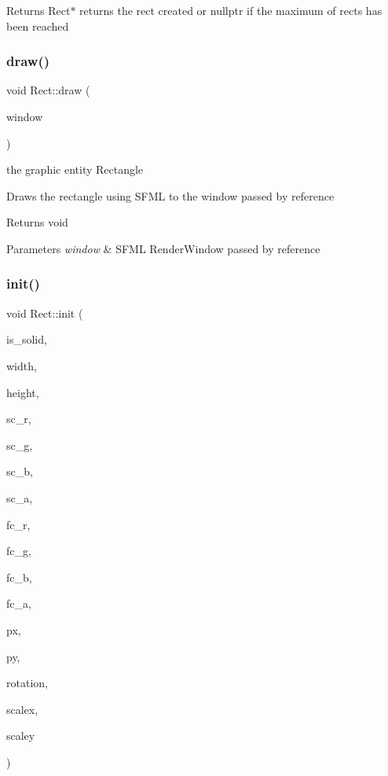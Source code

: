 \begin{DoxyReturn}{Returns}
Rect$\ast$ returns the rect created or nullptr if the maximum of rects has been reached 
\end{DoxyReturn}
\mbox{\label{class_rect_aa131d780f6ebb75e9057c01221486adc}} 
\subsubsection{\texorpdfstring{draw()}{draw()}}
{\footnotesize\ttfamily void Rect\+::draw (\begin{DoxyParamCaption}\item[{sf\+::\+Render\+Window \&}]{window }\end{DoxyParamCaption})}

the graphic entity Rectangle

Draws the rectangle using S\+F\+ML to the window passed by reference

\begin{DoxyReturn}{Returns}
void 
\end{DoxyReturn}

\begin{DoxyParams}{Parameters}
{\em window} & S\+F\+ML Render\+Window passed by reference \\
\hline
\end{DoxyParams}
\mbox{\label{class_rect_aa780623e4639a2679ed300424142d50d}} 
\subsubsection{\texorpdfstring{init()}{init()}}
{\footnotesize\ttfamily void Rect\+::init (\begin{DoxyParamCaption}\item[{uint8\+\_\+t}]{is\+\_\+solid,  }\item[{float}]{width,  }\item[{float}]{height,  }\item[{uint8\+\_\+t}]{sc\+\_\+r,  }\item[{uint8\+\_\+t}]{sc\+\_\+g,  }\item[{uint8\+\_\+t}]{sc\+\_\+b,  }\item[{uint8\+\_\+t}]{sc\+\_\+a,  }\item[{uint8\+\_\+t}]{fc\+\_\+r,  }\item[{uint8\+\_\+t}]{fc\+\_\+g,  }\item[{uint8\+\_\+t}]{fc\+\_\+b,  }\item[{uint8\+\_\+t}]{fc\+\_\+a,  }\item[{float}]{px,  }\item[{float}]{py,  }\item[{float}]{rotation,  }\item[{float}]{scalex,  }\item[{float}]{scaley }\end{DoxyParamCaption})}


